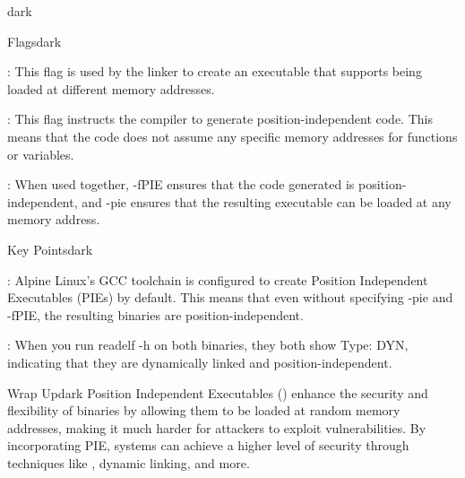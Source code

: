 \begin{baseBoxThree}{}{dark}
    \smallskip
    \begin{baseBoxThree}{Flags}{dark}
        \smallskip
        \begin{posnexItemize}
            \item[\sA] :  This flag is used by the linker to create an executable that supports being loaded at different memory addresses.
            \item[\sA] : This flag instructs the compiler to generate position-independent code. This means that the code does not assume any specific memory addresses for functions or variables.
            \item[\sA] : When used together, -fPIE ensures that the code generated is position-independent, and -pie ensures that the resulting executable can be loaded at any memory address.
        \end{posnexItemize}
        \smallskip
    \end{baseBoxThree}
    \smallskip
    \begin{baseBoxThree}{Key Points}{dark}
        \smallskip
        \begin{posnexItemize}
            \item[\sA] : Alpine Linux's GCC toolchain is configured to create Position Independent Executables (PIEs) by default. This means that even without specifying -pie and -fPIE, the resulting binaries are position-independent.
            \item[\sA] : When you run readelf -h on both binaries, they both show Type: DYN, indicating that they are dynamically linked and position-independent.
        \end{posnexItemize}
        \smallskip
    \end{baseBoxThree}
    \smallskip
    \begin{baseBoxThree}{Wrap Up}{dark}
        \smallskip
            Position Independent Executables () enhance the security and flexibility of binaries by allowing them to be loaded at random memory addresses, making it much harder for attackers to exploit vulnerabilities. By incorporating PIE, systems can achieve a higher level of security through techniques like , dynamic linking, and more.
        \smallskip
    \end{baseBoxThree}
    \smallskip
\end{baseBoxThree}
